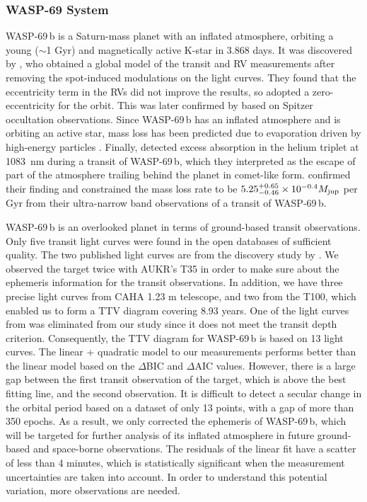 \documentclass[a4paper,fleqn,usenatbib]{mnras}
\begin{document}
\subsubsection{WASP-69 System}
WASP-69\,b is a Saturn-mass planet with an inflated atmosphere, orbiting a young ($\sim$1 Gyr) and magnetically active K-star in 3.868 days. It was discovered by \citet{2014MNRAS.445.1114A}, who obtained a global model of the transit and RV measurements after removing the spot-induced modulations on the light curves. They found that the eccentricity term in the RVs did not improve the results, so adopted a zero-eccentricity for the orbit. This was later confirmed by \citet{2019AJ....158..217W} based on Spitzer occultation observations. Since WASP-69\,b has an inflated atmosphere and is orbiting an active star, mass loss has been predicted due to evaporation driven by high-energy particles \citep{2014MNRAS.445.1114A}. Finally, \citet{2018Sci...362.1388N} detected excess absorption in the helium triplet at 1083~nm during a transit of WASP-69\,b, which they interpreted as the escape of part of the atmosphere trailing behind the planet in comet-like form. \citet{2020AJ....159..278V} confirmed their finding and constrained the mass loss rate to be $5.25^{+0.65}_{-0.46} \times 10^{-0.4} M_{\rm jup}$ per Gyr from their ultra-narrow band observations of a transit of WASP-69\,b.

WASP-69\,b is an overlooked planet in terms of ground-based transit observations. Only five transit light curves were found in the open databases of sufficient quality. The two published light curves are from the discovery study by \cite{2014MNRAS.445.1114A}. We observed the target twice with AUKR's T35 in order to make sure about the ephemeris information for the transit observations. In addition, we have three precise light curves from CAHA 1.23 m telescope, and two from the T100, which enabled us to form a TTV diagram covering 8.93 years. One of the light curves from \citep{2014MNRAS.445.1114A} was eliminated from our study since it does not meet the transit depth criterion. Consequently, the TTV diagram for WASP-69\,b is based on 13 light curves. The linear + quadratic model to our measurements performs better than the linear model based on the $\Delta$BIC and $\Delta$AIC values. However, there is a large gap between the first transit observation of the target, which is above the best fitting line, and the second observation. It is difficult to detect a secular change in the orbital period based on a dataset of only 13 points, with a gap of more than 350 epochs. As a result, we only corrected the ephemeris of WASP-69\,b, which will be targeted for further analysis of its inflated atmosphere in future ground-based and space-borne observations. The residuals of the linear fit have a scatter of less than 4 minutes, which is statistically significant when the measurement uncertainties are taken into account. In order to understand this potential variation, more observations are needed.  
\end{document}
